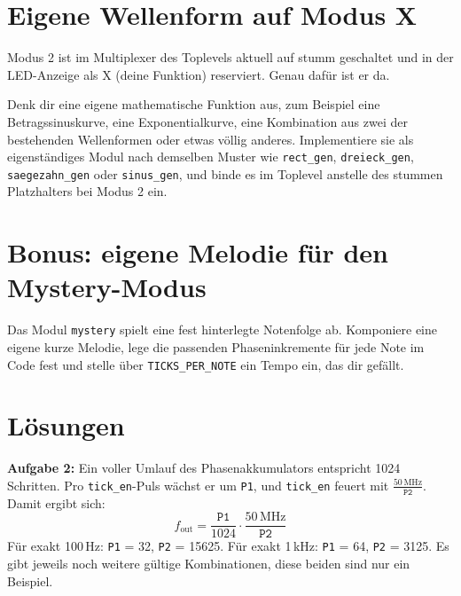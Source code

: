 \section{Eigene Wellenform auf Modus X}

Modus 2 ist im Multiplexer des Toplevels aktuell auf stumm geschaltet und in der LED-Anzeige als \glqq X (deine Funktion)\grqq{} reserviert. Genau dafür ist er da.

Denk dir eine eigene mathematische Funktion aus, zum Beispiel eine Betragssinuskurve, eine Exponentialkurve, eine Kombination aus zwei der bestehenden Wellenformen oder etwas völlig anderes. Implementiere sie als eigenständiges Modul nach demselben Muster wie \texttt{rect\_gen}, \texttt{dreieck\_gen}, \texttt{saegezahn\_gen} oder \texttt{sinus\_gen}, und binde es im Toplevel anstelle des stummen Platzhalters bei Modus 2 ein.

\section{Bonus: eigene Melodie für den Mystery-Modus}

Das Modul \texttt{mystery} spielt eine fest hinterlegte Notenfolge ab. Komponiere eine eigene kurze Melodie, lege die passenden Phaseninkremente für jede Note im Code fest und stelle über \texttt{TICKS\_PER\_NOTE} ein Tempo ein, das dir gefällt.

\section{Lösungen}

\textbf{Aufgabe 2:} Ein voller Umlauf des Phasenakkumulators entspricht 1024 Schritten. Pro \texttt{tick\_en}-Puls wächst er um \texttt{P1}, und \texttt{tick\_en} feuert mit $\frac{50\,\text{MHz}}{\texttt{P2}}$. Damit ergibt sich:
\[
f_{\text{out}} = \frac{\texttt{P1}}{1024} \cdot \frac{50\,\text{MHz}}{\texttt{P2}}
\]
Für exakt 100\,Hz: \texttt{P1} = 32, \texttt{P2} = 15625. Für exakt 1\,kHz: \texttt{P1} = 64, \texttt{P2} = 3125. Es gibt jeweils noch weitere gültige Kombinationen, diese beiden sind nur ein Beispiel.
